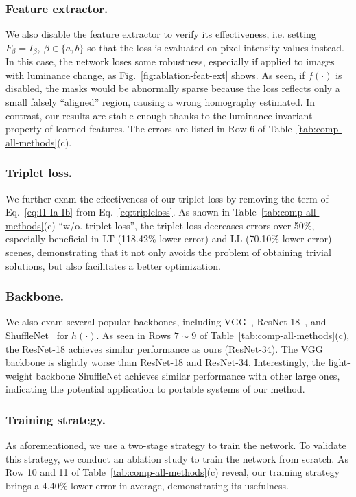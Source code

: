 \documentclass[runningheads]{llncs}
\begin{document}
\subsubsection{Feature extractor.}
We also disable the feature extractor to verify its effectiveness, i.e. setting $F_\beta = I_\beta,~\beta \in \{a,b\}$ so that the loss is evaluated on pixel intensity values instead. In this case, the network loses some robustness, especially if applied to images with luminance change, as Fig.~\ref{fig:ablation-feat-ext} shows. As seen, if $f(\cdot)$ is disabled, the masks would be abnormally sparse because the loss reflects only a small falsely ``aligned'' region, causing a wrong homography estimated. In contrast, our results are stable enough thanks to the luminance invariant property of learned features. The errors are listed in Row 6 of Table~\ref{tab:comp-all-methods}(c). 

\subsubsection{Triplet loss.}
We further exam the effectiveness of our triplet loss by removing the term of Eq.~\ref{eq:l1-Ia-Ib} from Eq.~\ref{eq:tripleloss}. As shown in Table~\ref{tab:comp-all-methods}(c) ``w/o. triplet loss'', the triplet loss decreases errors over 50\%, especially beneficial in LT (118.42\% lower error) and LL (70.10\% lower error) scenes, demonstrating that it not only avoids the problem of obtaining trivial solutions, but also facilitates a better optimization.

\subsubsection{Backbone.}
We also exam several popular backbones, including VGG~\cite{simonyan2014very}, ResNet-18~\cite{he2016deep}, and ShuffleNet~\cite{zhang2018shufflenet} for $h(\cdot)$. As seen in Rows $7\sim9$ of Table~\ref{tab:comp-all-methods}(c), the ResNet-18 achieves similar performance as ours (ResNet-34). The VGG backbone is slightly worse than ResNet-18 and ResNet-34. Interestingly, the light-weight backbone ShuffleNet achieves similar performance with other large ones, indicating the potential  application to portable systems of our method. 



\subsubsection{Training strategy.}\label{subsec:ablation-training-strategy}
As aforementioned, we use a two-stage strategy to train the network. To validate this strategy, we conduct an ablation study to train the network from scratch. As Row 10 and 11 of Table~\ref{tab:comp-all-methods}(c) reveal, our training strategy brings a 4.40\% lower error in average, demonstrating its usefulness.
\end{document}
